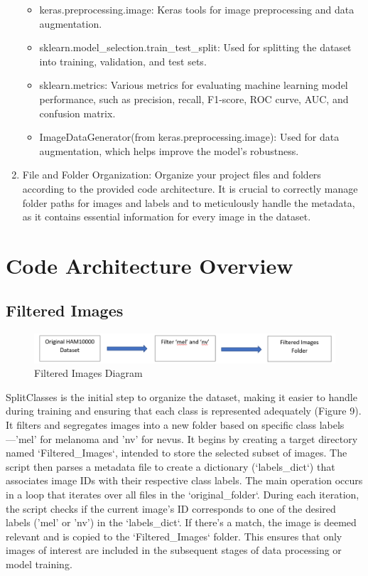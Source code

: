 \documentclass[10pt,twocolumn]{article}
\begin{document}
\begin{enumerate}
\begin{itemize}
        \item keras.preprocessing.image: Keras tools for image preprocessing and data augmentation.
        \item sklearn.model\_selection.train\_test\_split: Used for splitting the dataset into training, validation, and test sets.
        \item sklearn.metrics: Various metrics for evaluating machine learning model performance, such as precision, recall, F1-score, ROC curve, AUC, and confusion matrix.
        \item ImageDataGenerator(from keras.preprocessing.image): Used for data augmentation, which helps improve the model's robustness.
    \end{itemize}

    \item File and Folder Organization:
\newline   
Organize your project files and folders according to the provided code architecture. It is crucial to correctly manage folder paths for images and labels and to meticulously handle the metadata, as it contains essential information for every image in the dataset.
     
\end{enumerate}

\section{Code Architecture Overview}
\subsection{Filtered Images}
\begin{figure}[h]
\caption{Filtered Images Diagram}
\includegraphics[scale=0.4]{Class Split.png}\newline
\end{figure}

SplitClasses is the initial step to organize the dataset, making it easier to handle during training and ensuring that each class is represented adequately (Figure 9).
It filters and segregates images into a new folder based on specific class labels—'mel' for melanoma and 'nv' for nevus. It begins by creating a target directory named `Filtered\_Images`, intended to store the selected subset of images. The script then parses a metadata file to create a dictionary (`labels\_dict`) that associates image IDs with their respective class labels.
\newline
The main operation occurs in a loop that iterates over all files in the `original\_folder`. During each iteration, the script checks if the current image's ID corresponds to one of the desired labels ('mel' or 'nv') in the `labels\_dict`. If there's a match, the image is deemed relevant and is copied to the `Filtered\_Images` folder. This ensures that only images of interest are included in the subsequent stages of data processing or model training.
\end{document}
